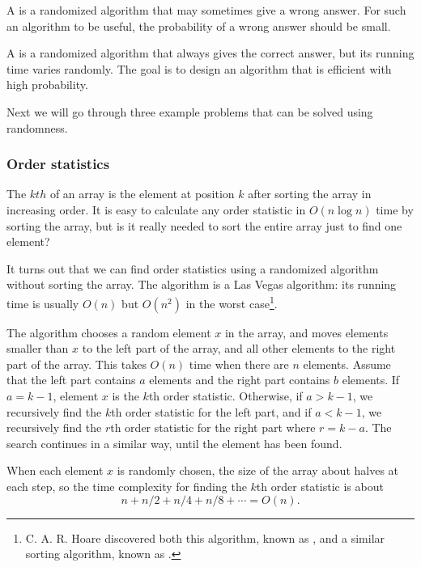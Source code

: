 
A  is a randomized algorithm
that may sometimes give a wrong answer.
For such an algorithm to be useful,
the probability of a wrong answer should be small.


A  is a randomized algorithm
that always gives the correct answer,
but its running time varies randomly.
The goal is to design an algorithm that is
efficient with high probability.

Next we will go through three example problems that
can be solved using randomness.

\subsubsection{Order statistics}


The $kth$  of an array
is the element at position $k$ after sorting
the array in increasing order.
It is easy to calculate any order statistic
in $O(n \log n)$ time by sorting the array,
but is it really needed to sort the entire array
just to find one element?

It turns out that we can find order statistics
using a randomized algorithm without sorting the array.
The algorithm is a Las Vegas algorithm:
its running time is usually $O(n)$
but $O(n^2)$ in the worst case\footnote{C. A. R. Hoare
discovered both this algorithm, known as  \cite{hoa61b},
and a similar sorting algorithm, known as  \cite{hoa61a}.}.

The algorithm chooses a random element $x$
in the array, and moves elements smaller than $x$
to the left part of the array,
and all other elements to the right part of the array.
This takes $O(n)$ time when there are $n$ elements.
Assume that the left part contains $a$ elements
and the right part contains $b$ elements.
If $a=k-1$, element $x$ is the $k$th order statistic.
Otherwise, if $a>k-1$, we recursively find the $k$th order
statistic for the left part,
and if $a<k-1$, we recursively find the $r$th order
statistic for the right part where $r=k-a$.
The search continues in a similar way, until the element
has been found.

When each element $x$ is randomly chosen,
the size of the array about halves at each step,
so the time complexity for
finding the $k$th order statistic is about
\[n+n/2+n/4+n/8+\cdots=O(n).\]

